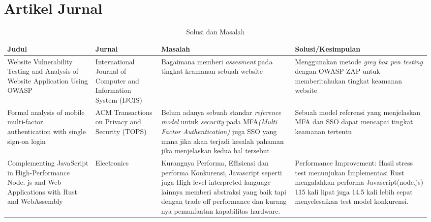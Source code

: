 \documentclass{article}
\begin{document}
\section*{Artikel Jurnal}
\begin{center}
    \begin{longtable}{|p{2.5cm}|p{2.5cm}|p{5cm}|p{5cm}|}
        \caption{Solusi dan Masalah}
        \label{tab:table1}\\
        \hline
        Judul & Jurnal & Masalah & Solusi/Kesimpulan \\
        \hline
        Website Vulnerability Testing and Analysis of Website Application Using OWASP
        & International Journal of Computer and Information System (IJCIS) 
        & Bagaimana memberi \emph{assesment} pada tingkat keamanan sebuah website
        & Menggunakan metode \emph{grey box pen testing} dengan OWASP-ZAP untuk memberitahukan tingkat keamanan website\\
        \hline
        Formal analysis of mobile multi-factor authentication with single sign-on login
        & ACM Transactions on Privacy and Security (TOPS)
        &  Belum adanya sebuah standar \emph{reference model}  untuk \emph{security} pada MFA\emph{(Multi Factor Authentication)} juga SSO yang mana jika akan terjadi kesalah pahaman jika menjelaskan kedua hal tersebut
        & Sebuah model referensi yang menjelaskan MFA dan SSO dapat mencapai tingkat keamanan tertentu 
        \\
        \hline
        Complementing JavaScript in High-Performance Node. js and Web Applications with Rust and WebAssembly
        & Electronics
        & Kurangnya Performa, Effisiensi dan performa Konkurensi, Javascript seperti juga High-level interpreted language lainnya memberi abstraksi yang baik tapi dengan trade off performance dan kurang nya pemanfaatan kapabilitas hardware.
        & Performance Improvement: Hasil stress test menunjukan Implementasi Rust mengalahkan performa Javascript(node.js) 115 kali lipat juga 14.5 kali lebih cepat menyelesaikan test model konkurensi.
        \\
        \hline
    \end{longtable}
\end{center}



\end{document}
